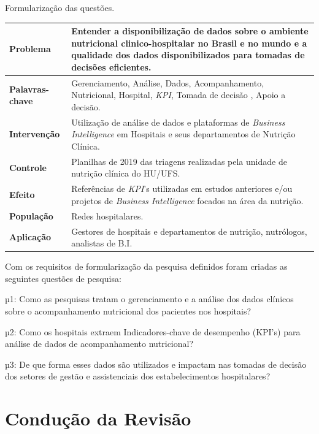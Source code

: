 \begin{quadro}[htb]
\caption{\label{quadro_formularizacaoPergunta}Formularização das questões.}
\label{}
\begin{tabular}{|p{3cm}|p{8cm}|}
	\hline
	\textbf{Problema}       & Entender a disponibilização de dados sobre o ambiente nutricional clinico-hospitalar no Brasil e no mundo e a qualidade dos dados disponibilizados para tomadas de decisões eficientes.  \\ \hline
	\textbf{Palavras-chave} & Gerenciamento, Análise, Dados, Acompanhamento, Nutricional, Hospital, \textit{KPI}, Tomada de decisão , Apoio a decisão.   \\ \hline
	\textbf{Intervenção}    & Utilização de análise de dados e plataformas de \textit{Business Intelligence} em Hospitais e seus departamentos de Nutrição Clínica.   \\ \hline
	\textbf{Controle}       & Planilhas de 2019 das triagens realizadas pela unidade de nutrição clínica do HU/UFS.
 \\ \hline
	\textbf{Efeito}         & Referências de \textit{KPI}’s utilizadas em estudos anteriores e/ou projetos de \textit{Business Intelligence} focados na área da nutrição. \\ \hline
	\textbf{População}      & Redes hospitalares. \\ \hline
	\textbf{Aplicação}      & Gestores de hospitais e departamentos de nutrição, nutrólogos, analistas de B.I.\\ \hline
\end{tabular}
\end{quadro}

Com os requisitos de formularização da pesquisa definidos foram criadas as seguintes questões de pesquisa:

µ1: Como as pesquisas tratam o gerenciamento e a análise dos dados clínicos sobre o acompanhamento nutricional dos pacientes nos hospitais?

µ2: Como os hospitais extraem Indicadores-chave de desempenho (KPI’s) para análise de dados de acompanhamento nutricional?

µ3: De que forma esses dados são utilizados e impactam nas tomadas de decisão dos setores de gestão e assistenciais dos estabelecimentos hospitalares?


\section{Condução da Revisão}


